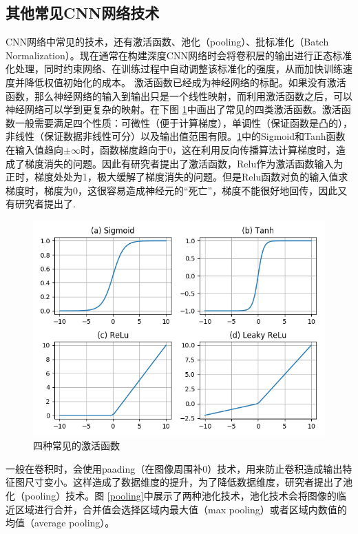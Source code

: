 \documentclass[ pdftex, oneside, master]{NJUthesis}
\begin{document}
\subsection{其他常见CNN网络技术}
CNN网络中常见的技术，还有激活函数、池化（pooling）、批标准化（Batch Normalization）\cite{batchnormalization}。现在通常在构建深度CNN网络时会将卷积层的输出进行正态标准化处理，同时约束网络、在训练过程中自动调整该标准化的强度，从而加快训练速度并降低权值初始化的成本。
激活函数已经成为神经网络的标配。如果没有激活函数，那么神经网络的输入到输出只是一个线性映射，而利用激活函数之后，可以神经网络可以学到更复杂的映射。在下图 \ref{activation}中画出了常见的四类激活函数。激活函数一般需要满足四个性质：可微性（便于计算梯度），单调性（保证函数是凸的），非线性（保证数据非线性可分）以及输出值范围有限。\ref{activation}中的Sigmoid和Tanh函数在输入值趋向$\pm\infty$时，函数梯度趋向于0，这在利用反向传播算法\cite{bp}计算梯度时，造成了梯度消失的问题。因此有研究者提出了激活函数\cite{relu}，Relu作为激活函数输入为正时，梯度处处为1，极大缓解了梯度消失的问题。但是Relu函数对负的输入值求梯度时，梯度为0，这很容易造成神经元的“死亡”，梯度不能很好地回传，因此又有研究者提出了\cite{leakyrelu}.

\begin{figure}[h]
	\centering
	\includegraphics[width=0.7\linewidth]{activation.png}  %
	\caption{四种常见的激活函数}  %
	\label{activation}   %
\end{figure}

一般在卷积时，会使用paading（在图像周围补0）技术，用来防止卷积造成输出特征图尺寸变小。这样造成了数据维度的提升，为了降低数据维度，研究者提出了池化（pooling）技术。图  \ref{pooling}中展示了两种池化技术，池化技术会将图像的临近区域进行合并，合并值会选择区域内最大值（max pooling）或者区域内数值的均值（average pooling）。
\end{document}
